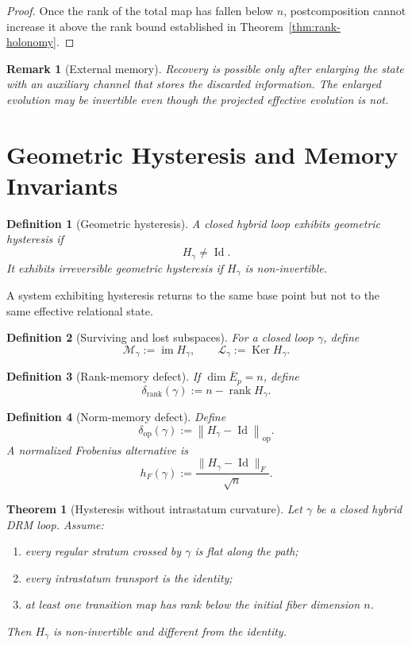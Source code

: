 \documentclass[11pt]{article}
\newtheorem{definition}{Definition}[section]
\newtheorem{theorem}{Theorem}[section]
\newtheorem{remark}{Remark}[section]
\newcommand{\Id}{\operatorname{Id}}
\newcommand{\Ker}{\operatorname{Ker}}
\newcommand{\rank}{\operatorname{rank}}
\newcommand{\im}{\operatorname{im}}
\newcommand{\opnorm}[1]{\left\lVert #1\right\rVert_{\mathrm{op}}}
\begin{document}
\begin{proof}
Once the rank of the total map has fallen below $n$, postcomposition cannot
increase it above the rank bound established in
Theorem~\ref{thm:rank-holonomy}.
\end{proof}

\begin{remark}[External memory]
Recovery is possible only after enlarging the state with an auxiliary channel
that stores the discarded information. The enlarged evolution may be
invertible even though the projected effective evolution is not.
\end{remark}

\section{Geometric Hysteresis and Memory Invariants}
\label{sec:hysteresis}

\begin{definition}[Geometric hysteresis]
A closed hybrid loop exhibits geometric hysteresis if
\[
H_\gamma\ne\Id.
\]
It exhibits irreversible geometric hysteresis if $H_\gamma$ is non-invertible.
\end{definition}

A system exhibiting hysteresis returns to the same base point but not to the
same effective relational state.

\begin{definition}[Surviving and lost subspaces]
For a closed loop $\gamma$, define
\[
\mathcal M_\gamma:=\im H_\gamma,
\qquad
\mathcal L_\gamma:=\Ker H_\gamma.
\]
\end{definition}

\begin{definition}[Rank-memory defect]
If $\dim\overline E_p=n$, define
\[
\delta_{\mathrm{rank}}(\gamma):=n-\rank H_\gamma.
\]
\end{definition}

\begin{definition}[Norm-memory defect]
Define
\[
\delta_{\mathrm{op}}(\gamma):=
\opnorm{H_\gamma-\Id}.
\]
A normalized Frobenius alternative is
\[
h_F(\gamma):=
\frac{\|H_\gamma-\Id\|_F}{\sqrt n}.
\]
\end{definition}

\begin{theorem}[Hysteresis without intrastatum curvature]
\label{thm:flat-hysteresis}
Let $\gamma$ be a closed hybrid DRM loop. Assume:
\begin{enumerate}[label=(\roman*)]
\item every regular stratum crossed by $\gamma$ is flat along the path;
\item every intrastatum transport is the identity;
\item at least one transition map has rank below the initial fiber dimension
$n$.
\end{enumerate}
Then $H_\gamma$ is non-invertible and different from the identity.
\end{theorem}
\end{document}
